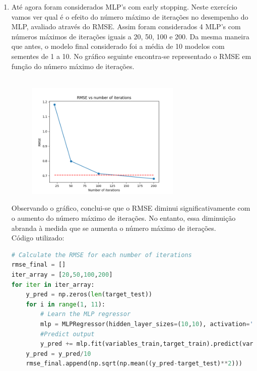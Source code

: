 \documentclass[a4paper,12pt]{article} %
\begin{document}
\begin{enumerate}
\begin{lstlisting}[language=Python]
print('The previous MAE is: ', mae)
print('The new MAE is: ', mae_new)

if mae_new < mae:
    print('The new MAE is lower than the previous one')
elif mae_new > mae:
    print('The new MAE is higher than the previous one')
else:
    print('The new MAE is equal to the previous one')
\end{lstlisting}

\item Até agora foram considerados MLP's com early stopping. Neste exercício vamos
ver qual é o efeito do número máximo de iterações no desempenho do MLP, avaliado através do RMSE.
Assim foram considerados 4 MLP's com números máximos de iterações iguais a 20, 50, 100 e 200. 
Da mesma maneira que antes, o modelo final considerado foi a média de 10 modelos com sementes de 1 a 10. 
No gráfico seguinte encontra-se representado o RMSE em função do número máximo de iterações.\\ \\

\begin{figure}[H]
\centering
\includegraphics[width=0.7\textwidth]{ex3_rmse.png}
\end{figure}

Observando o gráfico, conclui-se que o RMSE diminui significativamente com o aumento do número máximo de iterações.
No entanto, essa diminuição abranda à medida que se aumenta o número máximo de iterações.\\

Código utilizado:

\begin{lstlisting}[language=Python]
# Calculate the RMSE for each number of iterations
rmse_final = []
iter_array = [20,50,100,200]
for iter in iter_array:
    y_pred = np.zeros(len(target_test))
    for i in range(1, 11):
        # Learn the MLP regressor 
        mlp = MLPRegressor(hidden_layer_sizes=(10,10), activation='relu', solver='adam', max_iter = iter, random_state=i)
        #Predict output
        y_pred += mlp.fit(variables_train,target_train).predict(variables_test)
    y_pred = y_pred/10
    rmse_final.append(np.sqrt(np.mean((y_pred-target_test)**2)))


\end{lstlisting}
\end{enumerate}
\end{document}
